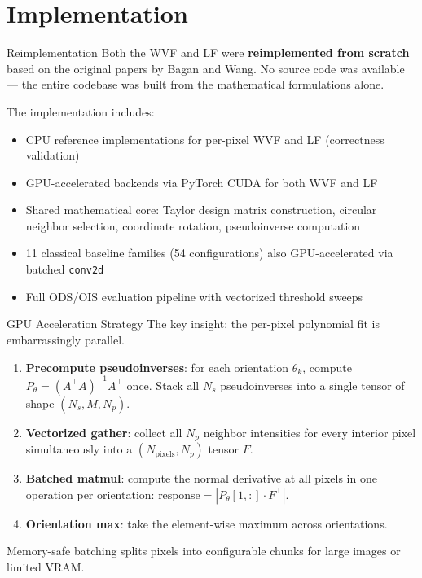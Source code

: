 \documentclass[10pt, aspectratio=169]{beamer}
\begin{document}
\section{Implementation}

\begin{frame}{Reimplementation}
  Both the WVF and LF were \textbf{reimplemented from scratch} based on the original papers by Bagan and Wang. No source code was available --- the entire codebase was built from the mathematical formulations alone.

  \vspace{0.5em}
  The implementation includes:
  \begin{itemize}
    \item CPU reference implementations for per-pixel WVF and LF (correctness validation)
    \item GPU-accelerated backends via PyTorch CUDA for both WVF and LF
    \item Shared mathematical core: Taylor design matrix construction, circular neighbor selection, coordinate rotation, pseudoinverse computation
    \item 11 classical baseline families (54 configurations) also GPU-accelerated via batched \texttt{conv2d}
    \item Full ODS/OIS evaluation pipeline with vectorized threshold sweeps
  \end{itemize}
\end{frame}

\begin{frame}{GPU Acceleration Strategy}
  The key insight: the per-pixel polynomial fit is embarrassingly parallel.

  \vspace{0.3em}
  \begin{enumerate}
    \item \textbf{Precompute pseudoinverses}: for each orientation $\theta_k$, compute $P_{\theta} = (A^\top A)^{-1} A^\top$ once. Stack all $N_s$ pseudoinverses into a single tensor of shape $(N_s, M, N_p)$.
    \item \textbf{Vectorized gather}: collect all $N_p$ neighbor intensities for every interior pixel simultaneously into a $(N_{\text{pixels}}, N_p)$ tensor $F$.
    \item \textbf{Batched matmul}: compute the normal derivative at all pixels in one operation per orientation: $\text{response} = |P_{\theta}[1,:] \cdot F^\top|$.
    \item \textbf{Orientation max}: take the element-wise maximum across orientations.
  \end{enumerate}

  \vspace{0.3em}
  Memory-safe batching splits pixels into configurable chunks for large images or limited VRAM.
\end{frame}
\end{document}
